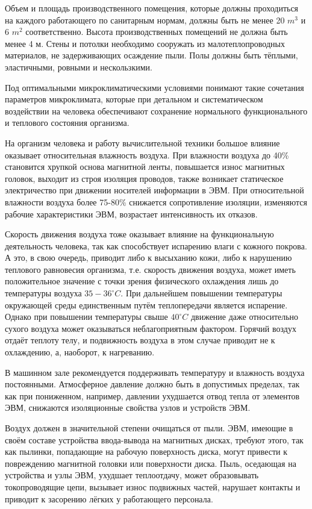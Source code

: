 Объем и площадь производственного помещения, которые должны проходиться на каждого работающего по санитарным нормам, должны быть не менее 20 $m^{3}$ и 6 $m^{2}$ соответственно. Высота производственных помещений не должна быть менее 4 м. Стены и потолки необходимо сооружать из малотеплопроводных материалов, не задерживающих осаждение пыли. Полы должны быть тёплыми, эластичными, ровными и нескользкими.

Под оптимальными микроклиматическими условиями понимают такие сочетания параметров микроклимата, которые при детальном и систематическом воздействии на человека обеспечивают сохранение нормального функционального и теплового состояния организма.

На организм человека и работу вычислительной техники большое влияние оказывает относительная влажность воздуха. При влажности воздуха до 40\% становится хрупкой основа магнитной ленты, повышается износ магнитных головок, выходит из строя изоляция проводов, также возникает статическое электричество при движении носителей информации в ЭВМ. При относительной влажности воздуха более 75-80\% снижается сопротивление изоляции, изменяются рабочие характеристики ЭВМ, возрастает интенсивность их отказов.

Скорость движения воздуха тоже оказывает влияние на функциональную деятельность человека, так как способствует испарению влаги с кожного покрова. А это, в свою очередь, приводит либо к высыханию кожи, либо к нарушению теплового равновесия организма, т.е. скорость движения воздуха, может иметь положительное значение с точки зрения физического охлаждения лишь до температуры воздуха $35-36^{\circ} C$. При дальнейшем повышении температуры окружающей среды единственным путём теплопередачи является испарение. Однако при повышении температуры свыше $40^{\circ} C$ движение даже относительно сухого воздуха может оказываться неблагоприятным фактором. Горячий воздух отдаёт теплоту телу, и подвижность воздуха в этом случае приводит не к охлаждению, а, наоборот, к нагреванию.

В машинном зале рекомендуется поддерживать температуру и влажность воздуха постоянными. Атмосферное давление должно быть в допустимых пределах, так как при пониженном, например, давлении ухудшается отвод тепла от элементов ЭВМ, снижаются изоляционные свойства узлов и устройств ЭВМ.

Воздух должен в значительной степени очищаться от пыли. ЭВМ, имеющие в своём составе устройства ввода-вывода на магнитных дисках, требуют этого, так как пылинки, попадающие на рабочую поверхность диска, могут привести к повреждению магнитной головки или поверхности диска. Пыль, оседающая на устройства и узлы ЭВМ, ухудшает теплоотдачу, может образовывать токопроводящие цепи, вызывает износ подвижных частей, нарушает контакты и приводит к засорению лёгких у работающего персонала.

